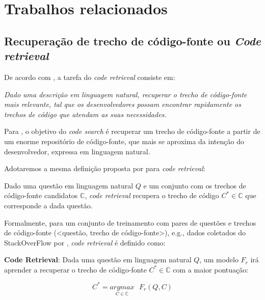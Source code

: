 \chapter{Trabalhos relacionados}
\label{cap:trabalhos-relacionados}



\section{Recuperação de trecho de código-fonte ou \textit{Code retrieval}}
\label{sec:code-retrieval}

De acordo com \cite{Chen-bi-variational-autoencoder:2018}, a tarefa do \textit{code retrieval} consiste em:

\emph{Dado uma descrição em linguagem natural, recuperar o trecho de código-fonte mais relevante, tal que os desenvolvedores possam encontrar rapidamente os trechos de código que atendam as suas necessidades.}

Para \cite{cambronero-deep-learning-code-search:2019}, o objetivo do \textit{code search} é recuperar um trecho de código-fonte a partir de um enorme repositório de código-fonte, que mais se aproxima da intenção do desenvolvedor, expressa em linguagem natural. 

Adotaremos a mesma definição proposta por \cite{iyer-etal-2016-summarizing, Yao-coacor:2019} para \textit{code retrieval}:

Dado uma questão em linguagem natural $Q$ e um conjunto com os trechos de código-fonte candidatos $\mathbb{C}$, \textit{code retrieval} recupera o trecho de código $C^{*} \in \mathbb{C}$ que corresponde a dada questão.

Formalmente, para um conjunto de treinamento com pares de questões e trechos de código-fonte (<questão, trecho de código-fonte>), e.g., dados coletados do StackOverFlow por \cite{yao-2018}, \textit{code retrieval} é definido como:

\textbf{Code Retrieval}: Dada uma questão em linguagem natural $Q$, um modelo $F_{r}$ irá aprender a recuperar o trecho de código-fonte $C^{*} \in \mathbb{C}$ com a maior pontuação:

\begin{equation}\label{eq:code-retrieval}
C^{*} = \underset{C \in \mathbb{C}}{argmax}\text{ } F_{r}(Q , C)
\end{equation}

